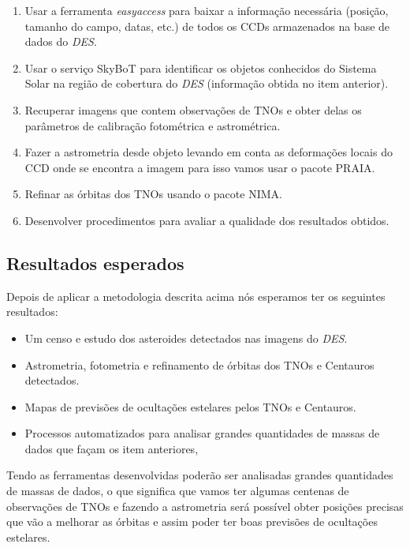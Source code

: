 \documentclass[a4paper, 11pt]{article}
\begin{document}
\begin{enumerate}
\item Usar a ferramenta \textit{easyaccess} para baixar a informa\c{c}\~ao necess\'aria (posi\c{c}\~ao, tamanho do campo, datas, etc.) de todos os CCDs armazenados na base de dados do \textit{DES}.
\item Usar o servi\c{c}o SkyBoT para identificar os objetos conhecidos do Sistema Solar na regi\~ao de cobertura do \textit{DES} (informa\c{c}\~ao obtida no item anterior).
\item Recuperar imagens que contem observa\c{c}\~oes de TNOs e obter delas os par\^ametros de calibra\c{c}\~ao fotom\'etrica e astrom\'etrica.
\item Fazer a astrometria desde objeto levando em conta as deforma\c{c}\~oes locais do CCD onde se encontra a imagem para isso vamos usar o pacote PRAIA.
\item Refinar as \'orbitas dos TNOs usando o pacote NIMA.
\item Desenvolver procedimentos para avaliar a qualidade dos resultados obtidos.
\end{enumerate}

\subsection{Resultados esperados}

Depois de aplicar a metodologia descrita acima n\'os esperamos ter os seguintes resultados:
\begin{itemize}
\item Um censo e estudo dos asteroides detectados nas imagens do \textit{DES}.
\item Astrometria, fotometria e refinamento de \'orbitas dos TNOs e Centauros detectados.
\item Mapas de previs\~oes de oculta\c{c}\~oes estelares pelos TNOs e Centauros.
\item Processos automatizados para analisar grandes quantidades de massas de dados que fa\c{c}am os item anteriores,
\end{itemize}

Tendo as ferramentas desenvolvidas poder\~ao ser analisadas grandes quantidades de massas de dados, o que significa que vamos ter algumas centenas de observa\c{c}\~oes de TNOs e fazendo a astrometria ser\'a poss\'ivel obter posi\c{c}\~oes precisas que v\~ao a melhorar as \'orbitas e assim poder ter boas previs\~oes de oculta\c{c}\~oes estelares. 

\newpage
\end{document}
